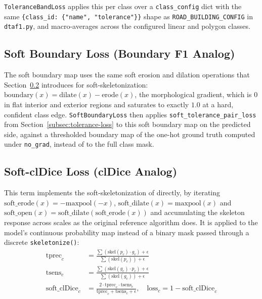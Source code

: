 \texttt{ToleranceBandLoss} applies this per class over a \texttt{class\_config} dict with the same
\texttt{\{class\_id: \{"name", "tolerance"\}\}} shape as \texttt{ROAD\_BUILDING\_CONFIG} in
\texttt{dtaf1.py}, and macro-averages across the configured linear and polygon classes.

\subsection{Soft Boundary Loss (Boundary F1 Analog)}
\label{subsec:boundary-loss}

The soft boundary map uses the same soft erosion and dilation operations that
Section~\ref{subsec:cldice-loss} introduces for soft-skeletonization:
$\mathrm{boundary}(x) = \mathrm{dilate}(x) - \mathrm{erode}(x)$, the morphological gradient, which
is $0$ in flat interior and exterior regions and saturates to exactly $1.0$ at a hard, confident
class edge. \texttt{SoftBoundaryLoss} then applies \texttt{soft\_tolerance\_pair\_loss} from
Section~\ref{subsec:tolerance-loss} to this soft boundary map on the predicted side, against a
thresholded boundary map of the one-hot ground truth computed under \texttt{no\_grad}, instead of
to the full class mask.

\subsection{Soft-clDice Loss (clDice Analog)}
\label{subsec:cldice-loss}

This term implements the soft-skeletonization of \citet{shit2021cldice} directly, by iterating
$\mathrm{soft\_erode}(x) = -\mathrm{maxpool}(-x)$, $\mathrm{soft\_dilate}(x) = \mathrm{maxpool}(x)$
and $\mathrm{soft\_open}(x) = \mathrm{soft\_dilate}(\mathrm{soft\_erode}(x))$ and accumulating the
skeleton response across scales as the original reference algorithm does. It is applied to the
model's continuous probability map instead of a binary mask passed through a discrete
\texttt{skeletonize()}:
\begin{align}
  \mathrm{tprec}_c &= \frac{\sum(\mathrm{skel}(p_c) \cdot g_c) + \epsilon}{\sum(\mathrm{skel}(p_c)) + \epsilon} \\
  \mathrm{tsens}_c &= \frac{\sum(\mathrm{skel}(g_c) \cdot p_c) + \epsilon}{\sum(\mathrm{skel}(g_c)) + \epsilon} \\
  \mathrm{soft\_clDice}_c &= \frac{2 \cdot \mathrm{tprec}_c \cdot \mathrm{tsens}_c}
                                  {\mathrm{tprec}_c + \mathrm{tsens}_c + \epsilon}, \quad
  \mathrm{loss}_c = 1 - \mathrm{soft\_clDice}_c
\end{align}

